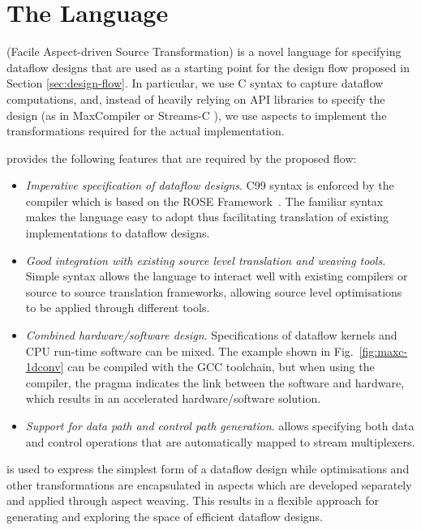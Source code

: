 \chapter{The \FAST{} Language}
\label{sec:fast}

\FAST{} (Facile Aspect-driven Source Transformation) is a novel
language for specifying dataflow designs that are used as a starting
point for the design flow proposed in Section
\ref{sec:design-flow}. In particular, we use C syntax to capture
dataflow computations, and, instead of heavily relying on API libraries
to specify the design (as in MaxCompiler \cite{5719584} or Streams-C
\cite{Gokhale:Stone:Arnold:Kalinowski:2000}), we use aspects to
implement the transformations required for the actual implementation.

\FAST{} provides the following features that are
required by the proposed flow:

\begin{itemize}
\item \emph{Imperative specification of dataflow designs}. C99 syntax
  is enforced by the \FAST{} compiler which is based on the ROSE
  Framework~\cite{Quinlan:2000}. The familiar syntax makes the
  language easy to adopt thus facilitating translation of existing
  implementations to dataflow designs.
\item \emph{Good integration with existing source level translation and
  weaving tools}. Simple syntax allows the language to interact well
  with existing compilers or source to source translation frameworks,
  allowing source level optimisations to be applied through different
  tools.
\item \emph{Combined hardware/software design}. Specifications of dataflow
  kernels and CPU run-time software can be mixed. The example shown in
  Fig.~\ref{fig:maxc-1dconv} can be compiled with the GCC toolchain,
  but when using the \FAST{} compiler, the pragma indicates the link
  between the software and hardware, which results in an accelerated
  hardware/software solution.
\item \emph{Support for data path and control path generation}. \FAST{}
  allows specifying both data and control operations that are
  automatically mapped to stream multiplexers.
\end{itemize}

\FAST{} is used to express the simplest form of a dataflow design
while optimisations and other transformations are encapsulated in
aspects which are developed separately and applied through aspect
weaving. This results in a flexible approach for generating and
exploring the space of efficient dataflow designs.


